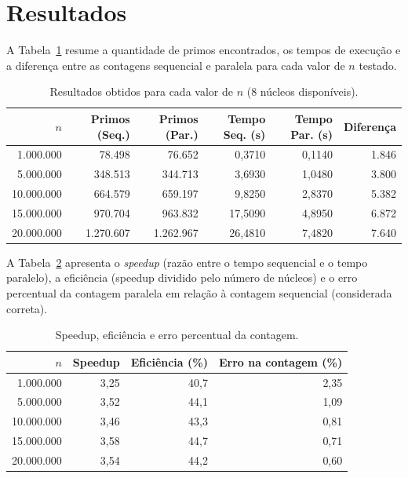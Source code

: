 \documentclass[a4paper,12pt]{article}
\begin{document}
\section{Resultados}

A Tabela~\ref{tab:resultados} resume a quantidade de primos encontrados, os tempos de
execução e a diferença entre as contagens sequencial e paralela para cada valor de $n$
testado.

\begin{table}[h!]
\centering
\caption{Resultados obtidos para cada valor de $n$ (8 núcleos disponíveis).}
\label{tab:resultados}
\begin{tabular}{@{}rrrrrr@{}}
\toprule
$n$ & Primos (Seq.) & Primos (Par.) & Tempo Seq. (s) & Tempo Par. (s) & Diferença \\
\midrule
1.000.000  & 78.498    & 76.652    & 0,3710  & 0,1140 & 1.846 \\
5.000.000  & 348.513   & 344.713   & 3,6930  & 1,0480 & 3.800 \\
10.000.000 & 664.579   & 659.197   & 9,8250  & 2,8370 & 5.382 \\
15.000.000 & 970.704   & 963.832   & 17,5090 & 4,8950 & 6.872 \\
20.000.000 & 1.270.607 & 1.262.967 & 26,4810 & 7,4820 & 7.640 \\
\bottomrule
\end{tabular}
\end{table}

A Tabela~\ref{tab:speedup} apresenta o \textit{speedup} (razão entre o tempo sequencial e
o tempo paralelo), a eficiência (speedup dividido pelo número de núcleos) e o erro
percentual da contagem paralela em relação à contagem sequencial (considerada correta).

\begin{table}[h!]
\centering
\caption{Speedup, eficiência e erro percentual da contagem.}
\label{tab:speedup}
\begin{tabular}{@{}rrrr@{}}
\toprule
$n$ & Speedup & Eficiência (\%) & Erro na contagem (\%) \\
\midrule
1.000.000  & 3,25 & 40,7 & 2,35 \\
5.000.000  & 3,52 & 44,1 & 1,09 \\
10.000.000 & 3,46 & 43,3 & 0,81 \\
15.000.000 & 3,58 & 44,7 & 0,71 \\
20.000.000 & 3,54 & 44,2 & 0,60 \\
\bottomrule
\end{tabular}
\end{table}
\end{document}
